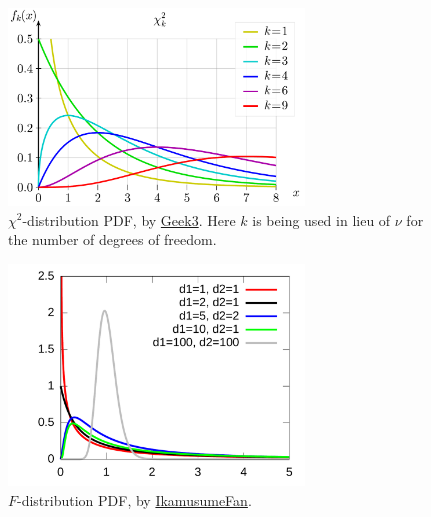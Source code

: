 \begin{figure}
\centering
\includegraphics[width=0.7\textwidth]{figures/stats/dist/chi2_pdf}
\caption{
$\chi^{2}$-distribution PDF,
by \href{https://en.wikipedia.org/wiki/File:Chi-square_pdf.svg}{Geek3}.
Here $k$ is being used in lieu of $\nu$ for the number of degrees of freedom.
}
\label{fig:dist:chi2}
\end{figure}

\begin{figure}
\centering
\includegraphics[width=0.7\textwidth,trim={1.5cm 0.1cm 0.1cm 0.1cm},clip]{figures/stats/dist/F_pdf}%
\caption{
$F$-distribution PDF,
by \href{https://en.wikipedia.org/wiki/File:F-distribution_pdf.svg}{IkamusumeFan}.
}
\label{fig:dist:F}
\end{figure}
